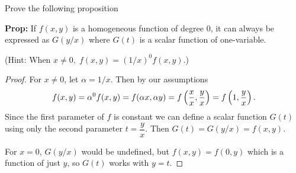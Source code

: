 Prove the following proposition

\noindent \textbf{Prop:} If $f(x,y)$ is a homogeneous function of degree 0, it can always be expressed as $G(y/x)$ where $G(t)$ is a scalar function of one-variable.

\noindent (Hint: When $x \neq 0,\; f(x,y) = (1/x)^0 f(x,y).$)

\begin{proof}
    For $x \neq 0$, let $\alpha = 1/x$. Then by our assumptions $$f(x,y) = \alpha^0 f(x,y)  = f(\alpha x, \alpha y) = f \pars{\frac{x}{x}, \frac{y}{x}} = f \pars{1, \frac{y}{x}}.$$ Since the first parameter of $f$ is constant we can define a scalar function $G(t)$ using only the second parameter $t = \dfrac{y}{x}$. Then $G(t) = G(y/x) = f(x,y)$.

    \nl For $x = 0$, $G(y/x)$ would be undefined, but $f(x,y) = f(0, y)$ which is a function of just $y$, so $G(t)$ works with $y = t$.
\end{proof}